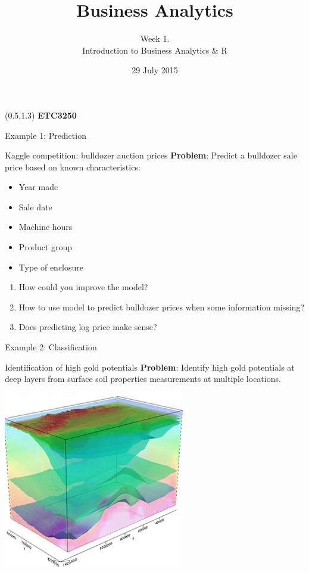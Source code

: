 \documentclass[14pt, handout]{beamer}
\title[Introduction to Business Analytics and R]{Business Analytics}
\author{Week 1.\\ Introduction to Business Analytics \& R}
\date{29 July 2015}
\begin{document}
\begin{frame}[plain]{}
\maketitle
\begin{textblock}{11}(0.5,1.3){\color{white}\large
\textbf{ETC3250}}
\end{textblock}

\end{frame}


\begin{frame}{Example 1: Prediction}\fontsize{13}{14}\sf

\begin{block}{Kaggle competition: bulldozer auction prices}
\textbf{Problem}: Predict a bulldozer sale price based on known characteristics:
\begin{itemize}
\item Year made
\item Sale date
\item Machine hours
\item Product group
\item Type of enclosure
\end{itemize}
\end{block}
\pause
\begin{enumerate}
\item How could you improve the model?
\item How to use model to predict bulldozer prices when some information missing?
\item Does predicting log price make sense?
\end{enumerate}


\end{frame}
\begin{frame}{Example 2: Classification}

\begin{block}{Identification of high gold potentials}
\textbf{Problem}: Identify high gold potentials at deep layers from surface soil properties measurements at multiple locations. 
\end{block}

\centerline{\includegraphics[scale=0.4]{../figures/layers.png}}

\end{frame}
\end{document}
